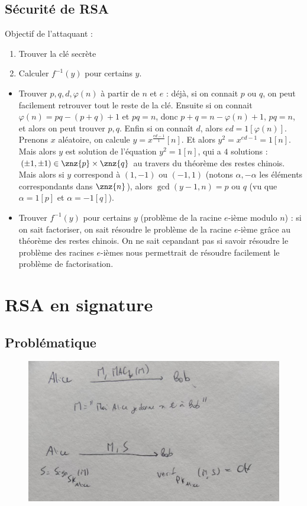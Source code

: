         \subsection{Sécurité de RSA}
            Objectif de l'attaquant :
            \begin{enumerate}
                \item Trouver la clé secrète
                \item Calculer $f^{-1}(y)$ pour certains $y$.
            \end{enumerate}
            \begin{itemize}
                \item Trouver $p, q, d, \varphi(n)$ à partir de $n$ et $e$ : déjà, si on connait $p$ ou $q$, on peut facilement retrouver tout le reste de la clé. Ensuite si on connait $\varphi(n) = pq - (p + q) + 1$ et $pq  = n$, donc $p + q = n - \varphi(n) + 1$, $pq = n$, et alors on peut trouver $p, q$. Enfin si on connaît $d$, alors $ed = 1[\varphi(n)]$. Prenons $x$ aléatoire, on calcule $y = x^{\frac{ed - 1}1} [n]$. Et alors $y^2 = x^{ed - 1} = 1[n]$. Mais alors $y$ est solution de l'équation $y^2 = 1 [n]$, qui a $4$ solutions : $(\pm 1, \pm 1) \in \znz{p} \times \znz{q}$ au travers du théorème des restes chinois. Mais alors si $y$ correspond à $(1, -1)$ ou $(-1, 1)$ (notons $\alpha, -\alpha$ les éléments correspondants dans $\znz{n}$), alors $\gcd(y - 1, n) = p$ ou $q$ (vu que $\alpha = 1[p]$ et $\alpha = -1[q]$).
                \item Trouver $f^{-1}(y)$ pour certains $y$ (problème de la racine $e$-ième modulo $n$) : si on sait factoriser, on sait résoudre le problème de la racine $e$-ième grâce au théorème des restes chinois. On ne sait cepandant pas si savoir résoudre le problème des racines $e$-ièmes nous permettrait de résoudre facilement le problème de factorisation. 
            \end{itemize}

    \section{RSA en signature}
        \subsection{Problématique}
            \begin{figure}[H]
                \centering
                \includegraphics[width=.5\textwidth]{03}
            \end{figure}
